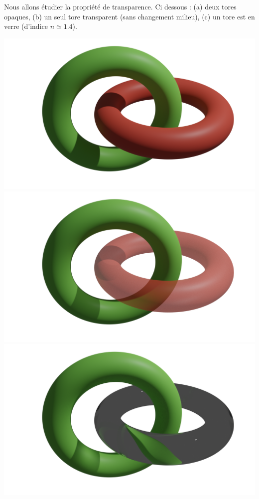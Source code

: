 \documentclass[11pt,class=report,crop=false]{standalone}
\begin{document}
Nous allons étudier la propriété de transparence.
Ci dessous : (a) deux tores opaques, (b) un seul tore transparent (sans changement milieu), (c) un tore est en verre (d'indice $n \simeq 1.4$). 
\begin{center}
	\includegraphics[scale=\myscale,scale=0.1,trim={6cm 2cm 4cm 0cm},clip]{figures/ray-tracing-02-1}
	\quad
	\includegraphics[scale=\myscale,scale=0.1,trim={8cm 2cm 4cm 0cm},clip]{figures/ray-tracing-02-2}
	\quad
    \includegraphics[scale=\myscale,scale=0.1,trim={4cm 2cm 4cm 0cm},clip]{figures/ray-tracing-02-3}	
\end{center}
\end{document}
